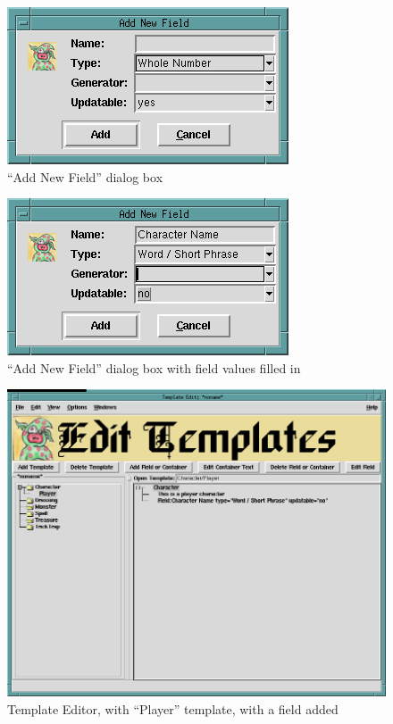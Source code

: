 \begin{figure}[hbpt]
\begin{centering}
\includegraphics{AddNewFieldDialog.png}
\caption{``Add New Field'' dialog box}
\label{fig:addnewfield}
\end{centering}
\end{figure}
\begin{figure}[hbpt]
\begin{centering}
\includegraphics{AddNewFieldDialogWithField.png}
\caption{``Add New Field'' dialog box with field values filled in}
\label{fig:addnewfieldfilledin}
\end{centering}
\end{figure}
\begin{figure}[hbpt]
\begin{centering}
\includegraphics[width=5in]{PlayerTemplateEditorWithField.png}
\caption{Template Editor, with ``Player'' template, with a field added}
\label{fig:playertemplateeditorwithfield}
\end{centering}
\end{figure}
